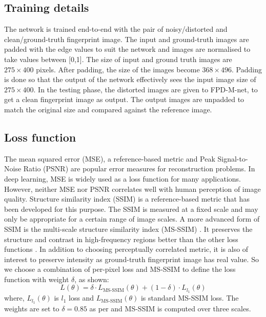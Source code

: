 \documentclass{llncs}
\begin{document}
\subsection{Training details}
\label{ssec:training}
The network is trained end-to-end with the pair of noisy/distorted and clean/ground-truth fingerprint image. The input and ground-truth images are padded with the edge values to suit the network and images are normalised to take values between [0,1]. The size of input and ground truth images are $275 \times 400$ pixels. After padding, the size of the images become $368 \times 496$. Padding is done so that the output of the network effectively sees the input image size of $275 \times 400$. In the testing phase, the distorted images are given to FPD-M-net, to get a clean fingerprint image as output. The output images are unpadded to match the original size and compared against the reference image.

\subsection{Loss function}
\label{ssec:loss}
\vspace{-0.2cm}
The mean squared error (MSE), a reference-based metric and Peak Signal-to-Noise Ratio (PSNR) are popular error measures for reconstruction problems. In deep learning, MSE is widely used as a loss function for many applications. However, neither MSE nor PSNR correlates well with human perception of image quality. Structure similarity index (SSIM) \cite{wang2004image} is a reference-based metric that has been developed for this purpose. The SSIM is measured at a fixed scale and may only be appropriate for a certain range of image scales. A more advanced form of SSIM is the multi-scale structure similarity index (MS-SSIM) \cite{wang2003multi}. It preserves the structure and contrast in high-frequency regions better than the other loss functions \cite{zhao2017loss}. In addition to choosing perceptually correlated metric, it is also of interest to preserve intensity as ground-truth fingerprint image has real value. So we choose a combination of per-pixel loss and MS-SSIM to define the loss function with weight $\delta$, as shown:
\begin{equation}
L(\theta) = \delta \cdot L_{\text{MS-SSIM}}(\theta) + (1-\delta) \cdot L_{l_1}(\theta)
\end{equation}
where, $L_{l_1}(\theta)$ is $l_1$ loss and $L_{\text{MS-SSIM}}(\theta)$ is standard MS-SSIM loss. The weights are set to $\delta = 0.85$ as per \cite{zhao2017loss} and MS-SSIM is computed over three scales.
\end{document}

